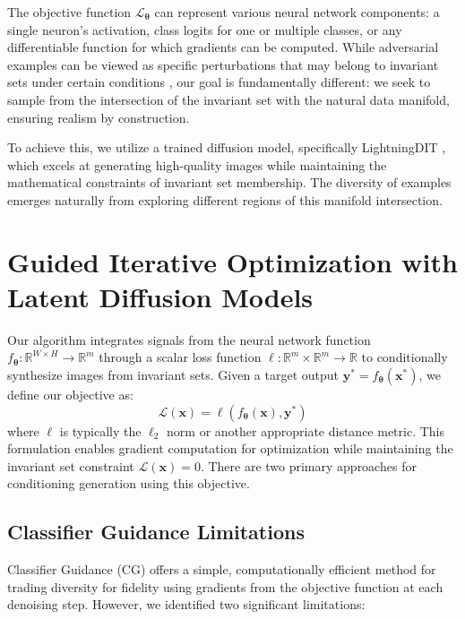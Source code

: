 \documentclass[licencjacka,en]{pracamgr}
\begin{document}
The objective function $\mathcal{L}_{\boldsymbol{\theta}}$ can represent various neural network components: a single neuron's activation, class logits for one or multiple classes, or any differentiable function for which gradients can be computed. While adversarial examples can be viewed as specific perturbations that may belong to invariant sets under certain conditions \citep{szegedy2014intriguingpropertiesneuralnetworks}, our goal is fundamentally different: we seek to sample from the intersection of the invariant set with the natural data manifold, ensuring realism by construction.

To achieve this, we utilize a trained diffusion model, specifically LightningDIT \citep{yao2025vavae} \citep{yao2024fasterdit}, which excels at generating high-quality images while maintaining the mathematical constraints of invariant set membership. The diversity of examples emerges naturally from exploring different regions of this manifold intersection.


\section{Guided Iterative Optimization with Latent Diffusion Models}

Our algorithm integrates signals from the neural network function $f_{\boldsymbol{\theta}}:\mathbb{R}^{W \times H} \rightarrow \mathbb{R}^m$ through a scalar loss function $\ell: \mathbb{R}^m \times \mathbb{R}^m \rightarrow \mathbb{R}$ to conditionally synthesize images from invariant sets. Given a target output $\mathbf{y^*} = f_{\boldsymbol{\theta}}(\mathbf{x^*})$, we define our objective as:
\begin{equation}
\mathcal{L}(\mathbf{x}) = \ell(f_{\boldsymbol{\theta}}(\mathbf{x}), \mathbf{y^*})
\end{equation}
where $\ell$ is typically the $\ell_2$ norm or another appropriate distance metric. This formulation enables gradient computation for optimization while maintaining the invariant set constraint $\mathcal{L}(\mathbf{x}) = 0$. There are two primary approaches for conditioning generation using this objective.

\subsection{Classifier Guidance Limitations}

Classifier Guidance (CG) \citep{dhariwal2021diffusionmodelsbeatgans} offers a simple, computationally efficient method for trading diversity for fidelity using gradients from the objective function at each denoising step. However, we identified two significant limitations:
\end{document}
